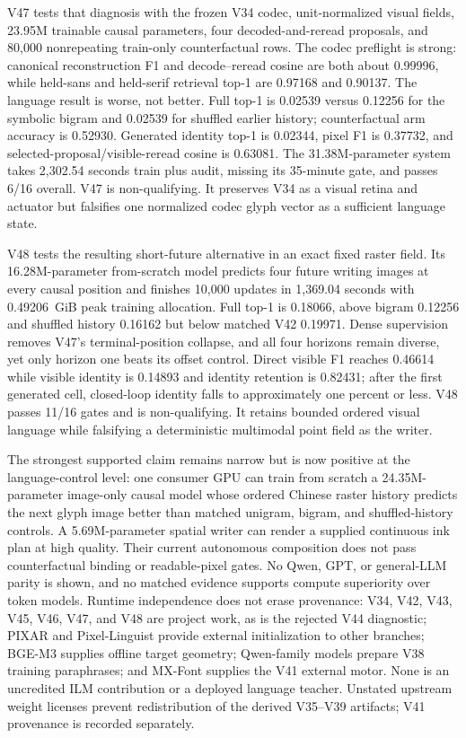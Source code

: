 \documentclass[11pt]{article}
\begin{document}
V47 tests that diagnosis with the frozen V34 codec, unit-normalized visual
fields, 23.95M trainable causal parameters, four decoded-and-reread proposals,
and 80,000 nonrepeating train-only counterfactual rows. The codec preflight is
strong: canonical reconstruction F1 and decode--reread cosine are both about
0.99996, while held-sans and held-serif retrieval top-1 are 0.97168 and
0.90137. The language result is worse, not better. Full top-1 is 0.02539 versus
0.12256 for the symbolic bigram and 0.02539 for shuffled earlier history;
counterfactual arm accuracy is 0.52930. Generated identity top-1 is 0.02344,
pixel F1 is 0.37732, and selected-proposal/visible-reread cosine is 0.63081.
The 31.38M-parameter system takes 2,302.54 seconds train plus audit, missing its
35-minute gate, and passes 6/16 overall. V47 is non-qualifying. It preserves
V34 as a visual retina and actuator but falsifies one normalized codec glyph
vector as a sufficient language state.

V48 tests the resulting short-future alternative in an exact fixed raster
field. Its 16.28M-parameter from-scratch model predicts four future writing
images at every causal position and finishes 10,000 updates in 1,369.04
seconds with 0.49206~GiB peak training allocation. Full top-1 is 0.18066,
above bigram 0.12256 and shuffled history 0.16162 but below matched V42
0.19971. Dense supervision removes V47's terminal-position collapse, and all
four horizons remain diverse, yet only horizon one beats its offset control.
Direct visible F1 reaches 0.46614 while visible identity is 0.14893 and
identity retention is 0.82431; after the first generated cell, closed-loop
identity falls to approximately one percent or less. V48 passes 11/16 gates
and is non-qualifying. It retains bounded ordered visual language while
falsifying a deterministic multimodal point field as the writer.

The strongest supported claim remains narrow but is now positive at the
language-control level: one consumer GPU can train from scratch a 24.35M-
parameter image-only causal model whose ordered Chinese raster history predicts
the next glyph image better than matched unigram, bigram, and shuffled-history
controls. A 5.69M-parameter spatial writer can render a supplied continuous ink
plan at high quality. Their current autonomous composition does not pass
counterfactual binding or readable-pixel gates. No Qwen, GPT, or general-LLM
parity is shown, and no matched evidence supports compute superiority over token
models. Runtime independence does not erase provenance: V34, V42, V43, V45,
V46, V47, and V48 are project work, as is the rejected V44 diagnostic; PIXAR and Pixel-Linguist
provide external initialization to other
branches; BGE-M3 supplies offline target geometry; Qwen-family models prepare
V38 training paraphrases; and MX-Font supplies the V41 external motor. None is
an uncredited ILM contribution or a deployed language teacher. Unstated
upstream weight licenses prevent redistribution of the derived V35--V39
artifacts; V41 provenance is recorded separately.
\end{document}
